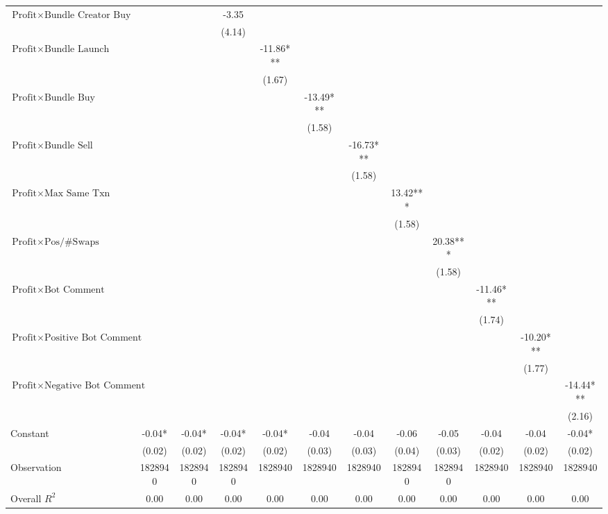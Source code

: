 \begin{tabular}{lccccccccccc}
$\text{Profit} \times \text{Bundle Creator Buy}$&  &  & -3.35 &  &  &  &  &  &  &  &  \\
&  &  & (4.14) &  &  &  &  &  &  &  &  \\
$\text{Profit} \times \text{Bundle Launch}$&  &  &  & -11.86*** &  &  &  &  &  &  &  \\
&  &  &  & (1.67) &  &  &  &  &  &  &  \\
$\text{Profit} \times \text{Bundle Buy}$&  &  &  &  & -13.49*** &  &  &  &  &  &  \\
&  &  &  &  & (1.58) &  &  &  &  &  &  \\
$\text{Profit} \times \text{Bundle Sell}$&  &  &  &  &  & -16.73*** &  &  &  &  &  \\
&  &  &  &  &  & (1.58) &  &  &  &  &  \\
$\text{Profit} \times \text{Max Same Txn}$&  &  &  &  &  &  & 13.42*** &  &  &  &  \\
&  &  &  &  &  &  & (1.58) &  &  &  &  \\
$\text{Profit} \times \text{Pos/\#Swaps}$&  &  &  &  &  &  &  & 20.38*** &  &  &  \\
&  &  &  &  &  &  &  & (1.58) &  &  &  \\
$\text{Profit} \times \text{Bot Comment}$&  &  &  &  &  &  &  &  & -11.46*** &  &  \\
&  &  &  &  &  &  &  &  & (1.74) &  &  \\
$\text{Profit} \times \text{Positive Bot Comment}$&  &  &  &  &  &  &  &  &  & -10.20*** &  \\
&  &  &  &  &  &  &  &  &  & (1.77) &  \\
$\text{Profit} \times \text{Negative Bot Comment}$&  &  &  &  &  &  &  &  &  &  & -14.44*** \\
&  &  &  &  &  &  &  &  &  &  & (2.16) \\
Constant& -0.04* & -0.04* & -0.04* & -0.04* & -0.04 & -0.04 & -0.06 & -0.05 & -0.04 & -0.04 & -0.04* \\
& (0.02) & (0.02) & (0.02) & (0.02) & (0.03) & (0.03) & (0.04) & (0.03) & (0.02) & (0.02) & (0.02) \\
Observation& 1828940 & 1828940 & 1828940 & 1828940 & 1828940 & 1828940 & 1828940 & 1828940 & 1828940 & 1828940 & 1828940 \\
Overall $R^2$& 0.00 & 0.00 & 0.00 & 0.00 & 0.00 & 0.00 & 0.00 & 0.00 & 0.00 & 0.00 & 0.00 \\
\hline
\end{tabular}
